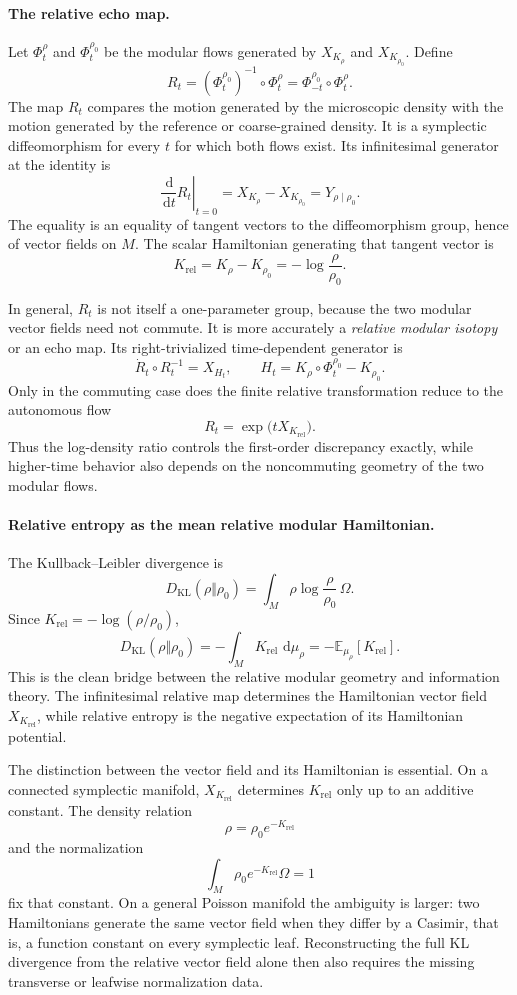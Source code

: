 \documentclass[a4paper,11pt]{article}
\theoremstyle{definition}
\newcommand{\dd}{\,\mathrm{d}}
\newcommand{\KLL}{D_{\mathrm{KL}}}
\begin{document}
\paragraph{The relative echo map.}
Let $\Phi_t^\rho$ and $\Phi_t^{\rho_0}$ be the modular flows generated by $X_{K_\rho}$ and $X_{K_{\rho_0}}$.  Define
\[
R_t
=
(\Phi_t^{\rho_0})^{-1}\circ\Phi_t^\rho
=
\Phi_{-t}^{\rho_0}\circ\Phi_t^\rho.
\]
The map $R_t$ compares the motion generated by the microscopic density with the motion generated by the reference or coarse-grained density.  It is a symplectic diffeomorphism for every $t$ for which both flows exist.  Its infinitesimal generator at the identity is
\[
\boxed{
\left.\frac{\dd}{\dd t}R_t\right|_{t=0}
=
X_{K_\rho}-X_{K_{\rho_0}}
=
Y_{\rho\mid\rho_0}.
}
\]
The equality is an equality of tangent vectors to the diffeomorphism group, hence of vector fields on $M$.  The scalar Hamiltonian generating that tangent vector is
\[
K_{\mathrm{rel}}
=
K_\rho-K_{\rho_0}
=
-\log\frac{\rho}{\rho_0}.
\]

In general, $R_t$ is not itself a one-parameter group, because the two modular vector fields need not commute.  It is more accurately a \emph{relative modular isotopy} or an echo map.  Its right-trivialized time-dependent generator is
\[
\dot R_t\circ R_t^{-1}
=
X_{H_t},
\qquad
H_t
=
K_\rho\circ\Phi_t^{\rho_0}-K_{\rho_0}.
\]
Only in the commuting case does the finite relative transformation reduce to the autonomous flow
\[
R_t=\exp\bigl(tX_{K_{\mathrm{rel}}}\bigr).
\]
Thus the log-density ratio controls the first-order discrepancy exactly, while higher-time behavior also depends on the noncommuting geometry of the two modular flows.

\paragraph{Relative entropy as the mean relative modular Hamiltonian.}
The Kullback--Leibler divergence is
\[
\KLL(\rho\Vert\rho_0)
=
\int_M \rho\log\frac{\rho}{\rho_0}\,\Omega.
\]
Since $K_{\mathrm{rel}}=-\log(\rho/\rho_0)$,
\[
\boxed{
\KLL(\rho\Vert\rho_0)
=
-\int_M K_{\mathrm{rel}}\,\dd\mu_\rho
=
-\mathbb E_{\mu_\rho}[K_{\mathrm{rel}}].
}
\]
This is the clean bridge between the relative modular geometry and information theory.  The infinitesimal relative map determines the Hamiltonian vector field $X_{K_{\mathrm{rel}}}$, while relative entropy is the negative expectation of its Hamiltonian potential.

The distinction between the vector field and its Hamiltonian is essential.  On a connected symplectic manifold, $X_{K_{\mathrm{rel}}}$ determines $K_{\mathrm{rel}}$ only up to an additive constant.  The density relation
\[
\rho=\rho_0e^{-K_{\mathrm{rel}}}
\]
and the normalization
\[
\int_M\rho_0e^{-K_{\mathrm{rel}}}\Omega=1
\]
fix that constant.  On a general Poisson manifold the ambiguity is larger: two Hamiltonians generate the same vector field when they differ by a Casimir, that is, a function constant on every symplectic leaf.  Reconstructing the full KL divergence from the relative vector field alone then also requires the missing transverse or leafwise normalization data.
\end{document}
